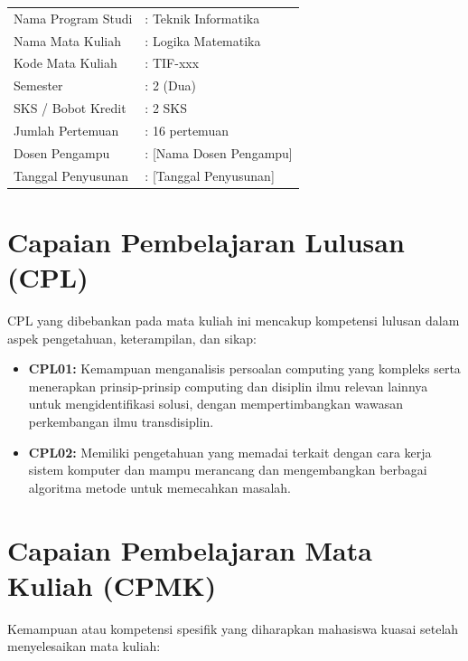 \begin{tabular}{ll}
  Nama Program Studi & : Teknik Informatika \\
  Nama Mata Kuliah & : Logika Matematika \\
  Kode Mata Kuliah & : TIF-xxx \\
  Semester & : 2 (Dua) \\
  SKS / Bobot Kredit & : 2 SKS \\
  Jumlah Pertemuan & : 16 pertemuan \\
  Dosen Pengampu & : [Nama Dosen Pengampu] \\
  Tanggal Penyusunan & : [Tanggal Penyusunan] \\
\end{tabular}

\vspace{1cm}

\section*{Capaian Pembelajaran Lulusan (CPL)}

CPL yang dibebankan pada mata kuliah ini mencakup kompetensi lulusan dalam aspek pengetahuan, keterampilan, dan sikap:

\begin{itemize}
  \item \textbf{CPL01:} Kemampuan menganalisis persoalan computing yang kompleks serta menerapkan prinsip-prinsip computing dan disiplin ilmu relevan lainnya untuk mengidentifikasi solusi, dengan mempertimbangkan wawasan perkembangan ilmu transdisiplin.
  
  \item \textbf{CPL02:} Memiliki pengetahuan yang memadai terkait dengan cara kerja sistem komputer dan mampu merancang dan mengembangkan berbagai algoritma metode untuk memecahkan masalah.
\end{itemize}

\section*{Capaian Pembelajaran Mata Kuliah (CPMK)}

Kemampuan atau kompetensi spesifik yang diharapkan mahasiswa kuasai setelah menyelesaikan mata kuliah:

